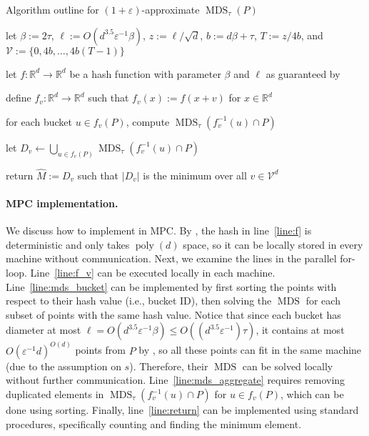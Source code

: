 \documentclass[11pt,letterpaper]{article}
\theoremstyle{plain}
\theoremstyle{definition}
\theoremstyle{remark}
\DeclareMathOperator{\poly}{poly}
\DeclareMathOperator{\MDS}{MDS}
\renewcommand{\epsilon}{\ensuremath{\varepsilon}}
\let\epsilon\varepsilon
\begin{document}
 

\begin{algorithm}[ht]
    \caption{Algorithm outline for $(1 + \epsilon)$-approximate $\MDS_{\tau}(P)$}
    \label{alg:imp_approx_mds}
    \begin{algorithmic}[1]
        \State let $\beta:= 2\tau$, $\ell:= O(d^{3.5}\varepsilon^{-1}\beta)$, $z:= \ell/\sqrt{d}$, $b:= d\beta+\tau$, $T:= z/4b$, and $\mathcal{V} := \{ 0, 4b, \ldots, 4b(T-1) \}$
        \label{line:parameters}
       
        \State let $f: \mathbb{R}^{d}\to \mathbb{R}^{d}$ be a hash function with parameter $\beta$  and $\ell$ as guaranteed by  

        \label{line:f}

        \label{line:for-loop}
        
        \State define $f_v : \mathbb{R}^d \to \mathbb{R}^d$ such that $f_{v}(x):= f(x + v)$ for $x \in \mathbb{R}^d$
        \label{line:f_v}
         
        \State for each bucket $u\in f_{v}(P)$, compute $\MDS_{\tau}(f_{v}^{-1}(u)\cap P)$
        \label{line:mds_bucket}
            
        \State let $D_{v}\gets \bigcup_{u\in f_{v}(P)} \MDS_{\tau}(f_{v}^{-1}(u)\cap P)$
        \label{line:mds_aggregate}


        \EndFor
        \State return $\widehat{M} := D_{v}$ such that $|D_{v}|$ is the minimum over all $v \in \mathcal{V}^d$
        \label{line:return}
           
    \end{algorithmic}
\end{algorithm}

\paragraph{MPC implementation.}
We discuss how to implement  in MPC.
By , the hash in line~\ref{line:f} is deterministic and only takes $\poly(d)$ space,
so it can be locally stored in every machine without communication.
Next, we examine the lines in the parallel for-loop.
Line~\ref{line:f_v} can be executed locally in each machine.
Line~\ref{line:mds_bucket} can be implemented by first sorting the points with respect to their hash value (i.e., bucket ID),
then solving the $\MDS$ for each subset of points with the same hash value.
Notice that since each bucket has diameter at most $\ell = O(d^{3.5}\epsilon^{-1} \beta) \leq O((d^{3.5}\epsilon^{-1})\tau)$,
it contains at most $O(\varepsilon^{-1}d)^{O(d)}$ points from $P$ by , 
so all these points can fit in the same machine (due to the assumption on $s$).
Therefore, their $\MDS$ can be solved locally without further communication.
Line~\ref{line:mds_aggregate} requires removing duplicated elements in $\MDS_\tau(f_v^{-1}(u) \cap P)$ for $u \in f_v(P)$,
which can be done using sorting.
Finally, line~\ref{line:return} can be implemented using standard procedures, specifically counting and finding the minimum element.
\end{document}
